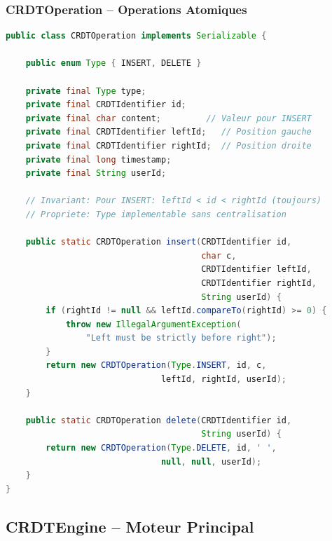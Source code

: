 \documentclass[11pt,a4paper,hidelinks]{book}
\begin{document}
\subsubsection{CRDTOperation -- Operations Atomiques}

\begin{lstlisting}[language=Java, caption={CRDTOperation -- Operation Atomique}]
public class CRDTOperation implements Serializable {
    
    public enum Type { INSERT, DELETE }
    
    private final Type type;
    private final CRDTIdentifier id;
    private final char content;         // Valeur pour INSERT
    private final CRDTIdentifier leftId;   // Position gauche
    private final CRDTIdentifier rightId;  // Position droite
    private final long timestamp;
    private final String userId;
    
    // Invariant: Pour INSERT: leftId < id < rightId (toujours)
    // Propriete: Type implementable sans centralisation
    
    public static CRDTOperation insert(CRDTIdentifier id, 
                                       char c,
                                       CRDTIdentifier leftId,
                                       CRDTIdentifier rightId,
                                       String userId) {
        if (rightId != null && leftId.compareTo(rightId) >= 0) {
            throw new IllegalArgumentException(
                "Left must be strictly before right");
        }
        return new CRDTOperation(Type.INSERT, id, c, 
                               leftId, rightId, userId);
    }
    
    public static CRDTOperation delete(CRDTIdentifier id, 
                                       String userId) {
        return new CRDTOperation(Type.DELETE, id, ' ', 
                               null, null, userId);
    }
}
\end{lstlisting}

\subsection{CRDTEngine -- Moteur Principal}
\end{document}
